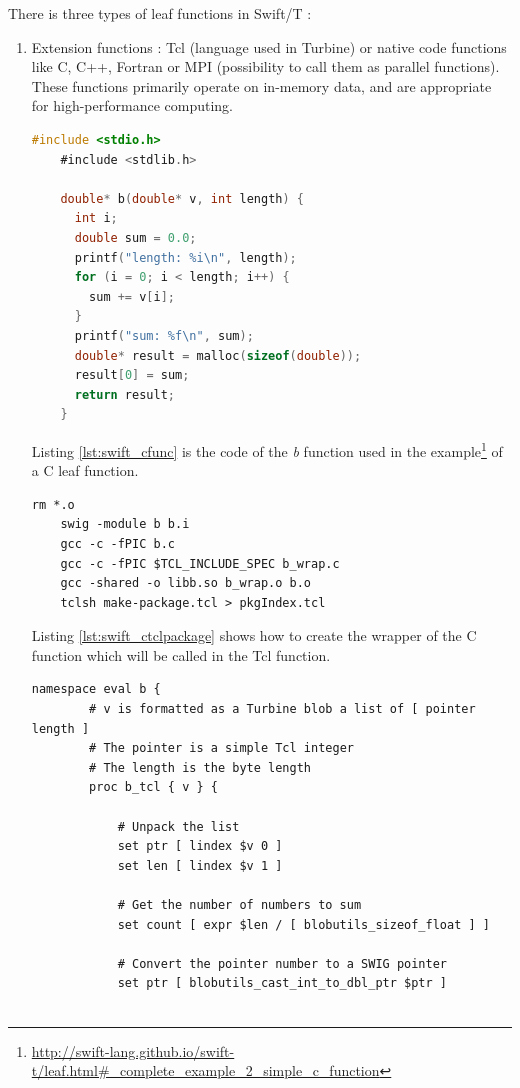 There is three types of leaf functions in Swift/T :
\begin{enumerate}
	\item Extension functions : Tcl (language used in Turbine) or native code functions like C, C++, Fortran or MPI (possibility to call them as parallel functions).
	These functions primarily operate on in-memory data, and are appropriate for high-performance computing.
	\begin{lstlisting}[basicstyle=\ttfamily, tabsize=3, frame=single, language=C, caption=C function\label{lst:swift_cfunc}]
	#include <stdio.h>
	#include <stdlib.h>

	double* b(double* v, int length) {
	  int i;
	  double sum = 0.0;
	  printf("length: %i\n", length);
	  for (i = 0; i < length; i++) {
	    sum += v[i];
	  }
	  printf("sum: %f\n", sum);
	  double* result = malloc(sizeof(double));
	  result[0] = sum;
	  return result;
	}
	\end{lstlisting}
	Listing \ref{lst:swift_cfunc} is the code of the \textit{b} function used in the example\footnote{\url{http://swift-lang.github.io/swift-t/leaf.html\#_complete_example_2_simple_c_function}} of a C leaf function.

	\begin{lstlisting}[basicstyle=\ttfamily, tabsize=3, frame=single, caption=Creation of the Tcl package\label{lst:swift_ctclpackage}]
	rm *.o
	swig -module b b.i
	gcc -c -fPIC b.c
	gcc -c -fPIC $TCL_INCLUDE_SPEC b_wrap.c
	gcc -shared -o libb.so b_wrap.o b.o
	tclsh make-package.tcl > pkgIndex.tcl
	\end{lstlisting}
	Listing \ref{lst:swift_ctclpackage} shows how to create the wrapper of the C function which will be called in the Tcl function.

	\begin{lstlisting}[basicstyle=\ttfamily, tabsize=3, frame=single, caption=Tcl wrapper around the C funtion\label{lst:swift_ctclfunc}]
	namespace eval b {
	    # v is formatted as a Turbine blob a list of [ pointer length ]
	    # The pointer is a simple Tcl integer
	    # The length is the byte length
	    proc b_tcl { v } {

	        # Unpack the list
	        set ptr [ lindex $v 0 ]
	        set len [ lindex $v 1 ]

	        # Get the number of numbers to sum
	        set count [ expr $len / [ blobutils_sizeof_float ] ]

	        # Convert the pointer number to a SWIG pointer
	        set ptr [ blobutils_cast_int_to_dbl_ptr $ptr ]


\end{lstlisting}
\end{enumerate}
